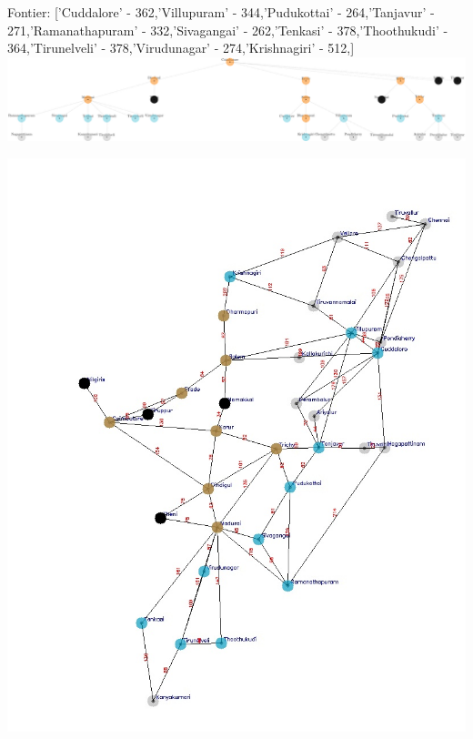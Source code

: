 \documentclass[xcolor=table]{beamer}
\begin{document}
\begin{frame}
  { \tiny Fontier: ['Cuddalore' - 362,'Villupuram' - 344,'Pudukottai' - 264,'Tanjavur' - 271,'Ramanathapuram' - 332,'Sivagangai' - 262,'Tenkasi' - 378,'Thoothukudi' - 364,'Tirunelveli' - 378,'Virudunagar' - 274,'Krishnagiri' - 512,]}
  \includegraphics[width=1\textwidth]{../UCSNodes/18-1.png}
  \begin{center}
    \includegraphics[height=0.55\textheight]{../UCSoutput/tamilUCS16.jpg}
  \end{center}
\end{frame}
\end{document}
